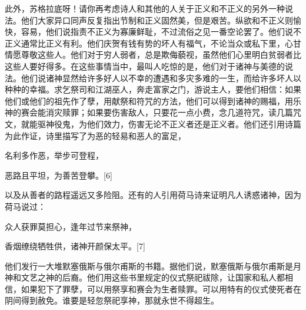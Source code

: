 \documentclass[12pt,oneside]{book}
\begin{document}
此外，苏格拉底呀！请你再考虑诗人和其他的人关于正义和不正义的另外一种说法。他们大家异口同声反复指出节制和正义固然美，但是艰苦。纵欲和不正义则愉快，容易，他们说指责不正义为寡廉鲜耻，不过流俗之见一番空论罢了。他们说不正义通常比正义有利。他们庆贺有钱有势的坏人有福气，不论当众或私下里，心甘情愿尊敬这些人。他们对于穷人弱者，总是欺侮藐视，虽然他们心里明白贫弱者比这些人要好得多。在这些事情当中，最叫人吃惊的是，他们对于诸神与美德的说法。他们说诸神显然给许多好人以不幸的遭遇和多灾多难的一生，而给许多坏人以种种的幸福。求乞祭司和江湖巫人，奔走富家之门，游说主人，要他们相信：如果他们或他们的祖先作了孽，用献祭和符咒的方法，他们可以得到诸神的赐福，用乐神的赛会能消灾赎罪；如果要伤害敌人，只要花一点小费，念几道符咒，读几篇咒文，就能驱神役鬼，为他们效力，伤害无论不正义者还是正义者。他们还引用诗篇为此作证，诗里描写了为恶的轻易和恶人的富足，





名利多作恶，举步可登程，

恶路且平坦，为善苦登攀。[6]





以及从善者的路程遥远又多险阻。还有的人引用荷马诗来证明凡人诱惑诸神，因为荷马说过：





众人获罪莫担心，逢年过节来祭神，

香烟缭绕牺牲供，诸神开颜保太平。[7]





他们发行一大堆默塞俄斯与俄尔甫斯的书籍。据他们说，默塞俄斯与俄尔甫斯是月神和文艺之神的后裔。他们用这些书里规定的仪式祭祀祓除，让国家和私人都相信，如果犯下了罪孽，可以用祭享和赛会为生者赎罪。可以用特有的仪式使死者在阴间得到赦免。谁要是轻忽祭祀享神，那就永世不得超生。
\end{document}
